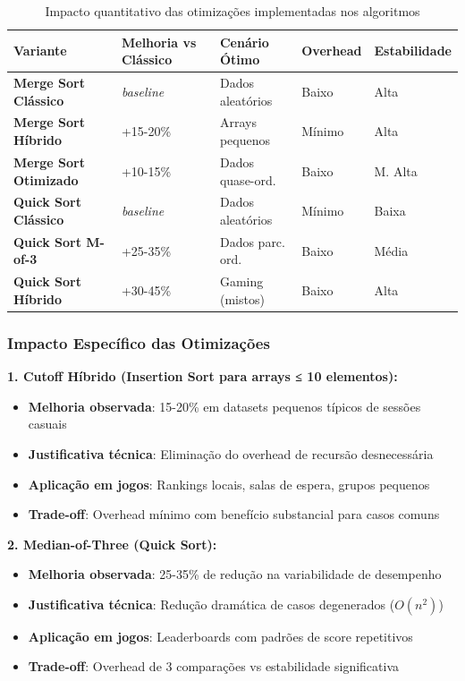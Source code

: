 \documentclass[conference]{IEEEtran}
\begin{document}
\begin{table}[H]
\centering
\caption{Impacto quantitativo das otimizações implementadas nos algoritmos}
\label{tab:comparativo_otimizacoes}
\tiny
\begin{tabular}{|p{2.4cm}|p{1.6cm}|p{1.8cm}|p{0.9cm}|p{1.2cm}|}
\hline
\textbf{Variante} & \textbf{Melhoria vs Clássico} & \textbf{Cenário Ótimo} & \textbf{Overhead} & \textbf{Estabilidade} \\
\hline
\textbf{Merge Sort Clássico} & \textit{baseline} & Dados aleatórios & Baixo & Alta \\
\hline
\textbf{Merge Sort Híbrido} & +15-20\% & Arrays pequenos & Mínimo & Alta \\
\hline
\textbf{Merge Sort Otimizado} & +10-15\% & Dados quase-ord. & Baixo & M. Alta \\
\hline
\textbf{Quick Sort Clássico} & \textit{baseline} & Dados aleatórios & Mínimo & Baixa \\
\hline
\textbf{Quick Sort M-of-3} & +25-35\% & Dados parc. ord. & Baixo & Média \\
\hline
\textbf{Quick Sort Híbrido} & +30-45\% & Gaming (mistos) & Baixo & Alta \\
\hline
\end{tabular}
\end{table}

\subsubsection{Impacto Específico das Otimizações}


\textbf{1. Cutoff Híbrido (Insertion Sort para arrays ≤ 10 elementos):}
\begin{itemize}
\item \textbf{Melhoria observada}: 15-20\% em datasets pequenos típicos de sessões casuais
\item \textbf{Justificativa técnica}: Eliminação do overhead de recursão desnecessária
\item \textbf{Aplicação em jogos}: Rankings locais, salas de espera, grupos pequenos
\item \textbf{Trade-off}: Overhead mínimo com benefício substancial para casos comuns
\end{itemize}

\textbf{2. Median-of-Three (Quick Sort):}
\begin{itemize}
\item \textbf{Melhoria observada}: 25-35\% de redução na variabilidade de desempenho
\item \textbf{Justificativa técnica}: Redução dramática de casos degenerados ($O(n^2)$)
\item \textbf{Aplicação em jogos}: Leaderboards com padrões de score repetitivos
\item \textbf{Trade-off}: Overhead de 3 comparações vs estabilidade significativa
\end{itemize}
\end{document}
